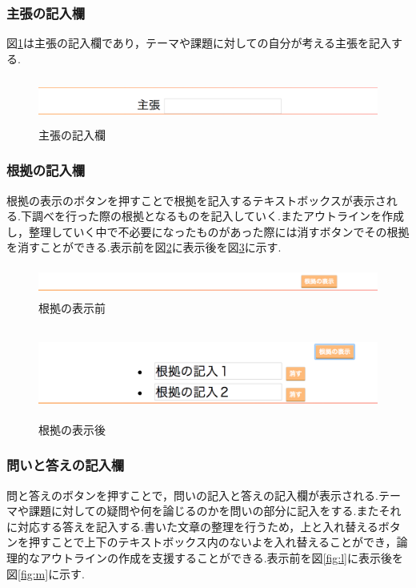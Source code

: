 \documentclass[a4j,12pt]{jarticle}
\begin{document}
\subsubsection{主張の記入欄}
図\ref{fig:i}は主張の記入欄であり，テーマや課題に対しての自分が考える主張を記入する.
\begin{figure}[h]
\begin{center}
 \includegraphics[clip,width=150mm,height=15mm]{figure/01shucho.png}
\end{center}
 \caption{主張の記入欄}
 \label{fig:i}
\end{figure}
\newpage
\subsubsection{根拠の記入欄}
根拠の表示のボタンを押すことで根拠を記入するテキストボックスが表示される.下調べを行った際の根拠となるものを記入していく.またアウトラインを作成し，整理していく中で不必要になったものがあった際には消すボタンでその根拠を消すことができる.表示前を図\ref{fig:j}に表示後を図\ref{fig:k}に示す.
\begin{figure}[h]
\begin{center}
 \includegraphics[clip,width=150mm,height=10mm]{figure/02konkyo.png}
\end{center}
 \caption{根拠の表示前}
 \label{fig:j}
\end{figure}

\begin{figure}[h]
\begin{center}
 \includegraphics[clip,width=150mm,height=30mm]{figure/03konkuo.png}
\end{center}
 \caption{根拠の表示後}
 \label{fig:k}
\end{figure}

\newpage
\subsubsection{問いと答えの記入欄}
問と答えのボタンを押すことで，問いの記入と答えの記入欄が表示される.テーマや課題に対しての疑問や何を論じるのかを問いの部分に記入をする.またそれに対応する答えを記入する.書いた文章の整理を行うため，上と入れ替えるボタンを押すことで上下のテキストボックス内のないよを入れ替えることができ，論理的なアウトラインの作成を支援することができる.表示前を図\ref{fig:l}に表示後を図\ref{fig:m}に示す.
\end{document}
